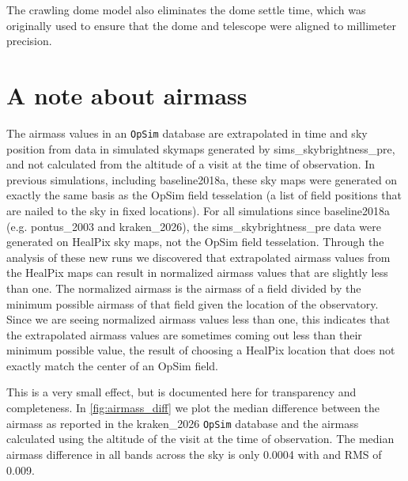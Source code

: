 \documentclass[DM,authoryear,toc]{lsstdoc}
\newcommand{\opsim}{\texttt{OpSim}\xspace}
\begin{document}
The crawling dome model also eliminates the dome settle time, which was originally used to ensure that the dome and telescope were aligned to millimeter precision.

\section{A note about airmass}

The airmass values in an \opsim database are extrapolated in time and sky position from data in simulated skymaps generated
by sims\_skybrightness\_pre, and not calculated from the altitude of a visit at the time of observation.
In previous simulations, including baseline2018a, these sky maps were generated on exactly the same basis as the OpSim field tesselation
(a list of field positions that are nailed to the sky in fixed locations). For all simulations since baseline2018a
(e.g. pontus\_2003 and kraken\_2026), the sims\_skybrightness\_pre data were generated on HealPix
sky maps, not the OpSim field tesselation. Through the analysis of these new runs we discovered that extrapolated airmass values
from the HealPix maps can result in normalized airmass values that are slightly less than one. The normalized
airmass is the airmass of a field divided by the minimum possible airmass of that field given the location
of the observatory. Since we are seeing normalized airmass values less than one, this indicates that the
extrapolated airmass values are sometimes coming out less than their minimum possible value, the result of
choosing a HealPix location that does not exactly match the center of an OpSim field.

This is a very small effect, but is documented here for transparency and
completeness.  In \autoref{fig:airmass_diff} we plot the median difference between the airmass as reported in the kraken\_2026
\opsim database and the airmass calculated using the altitude of the visit at the time of observation. The median airmass
difference in all bands across the sky is only 0.0004 with and RMS of 0.009.
\end{document}
